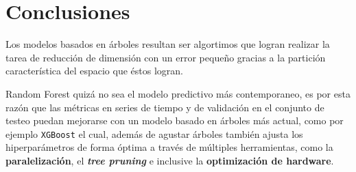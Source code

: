 \chapter{Conclusiones}
\label{C6}
Los modelos basados en árboles resultan ser algortimos que logran realizar la tarea de reducción de dimensión con un error pequeño gracias a la partición característica
del espacio que éstos logran.

Random Forest quizá no sea el modelo predictivo más contemporaneo, es por esta razón que las métricas en series de tiempo y de validación 
en el conjunto de testeo puedan mejorarse con un modelo basado en árboles más actual, como por ejemplo \texttt{XGBoost} el cual, además de agustar árboles
también ajusta los hiperparámetros de forma óptima a través de múltiples herramientas, como la \textbf{paralelización}, el \textit{\textbf{tree pruning}} e inclusive
la \textbf{optimización de hardware}.